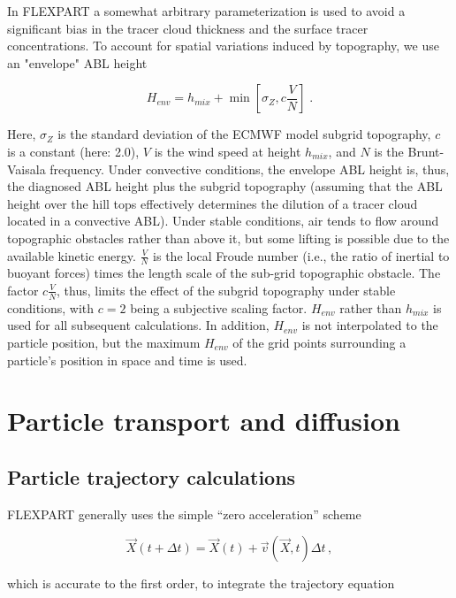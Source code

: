 \documentclass{egu}            %
\begin{document}
In FLEXPART a somewhat arbitrary parameterization is used to avoid a
significant bias in the tracer cloud thickness and the surface tracer
concentrations.  To account for spatial variations induced by topography, we
use an "envelope" ABL height

\begin{equation}
H_{env}=h_{mix}+\min \left[\sigma_Z, c \frac{V}{N} \right]\; .
\end{equation}

Here, $\sigma_Z$ is the standard deviation of the ECMWF model subgrid
topography, $c$ is a constant (here: 2.0), $V$ is the wind speed at height
$h_{mix}$, and $N$ is the Brunt-Vaisala frequency.  Under convective
conditions, the envelope ABL height is, thus, the diagnosed ABL height plus the
subgrid topography (assuming that the ABL height over the hill tops effectively
determines the dilution of a tracer cloud located in a convective ABL).  Under
stable conditions, air tends to flow around topographic obstacles rather than
above it, but some lifting is possible due to the available kinetic energy.
$\frac{V}{N}$ is the local Froude number (i.e., the ratio of inertial to
buoyant forces) times the length scale of the sub-grid topographic obstacle.
The factor $c \frac{V}{N}$, thus, limits the effect of the subgrid topography
under stable conditions, with $c=2$ being a subjective scaling factor.
$H_{env}$ rather than $h_{mix}$ is used for all subsequent calculations.  In
addition, $H_{env}$ is not interpolated to the particle position, but the
maximum $H_{env}$ of the grid points surrounding a particle's position in space
and time is used.

\section{\label{diffusion}Particle transport and diffusion}

\subsection{Particle trajectory calculations}

FLEXPART generally uses the simple ``zero acceleration'' scheme 

\begin{equation}
{\vec{X}}(t+\Delta t)={\vec{X}}(t)+{\vec{v}}({\vec{X}},t) \Delta t\,,
\label{firstorder}
\end{equation}

which is accurate to the first order, to integrate the trajectory equation \citep{stohl1998}
\end{document}
